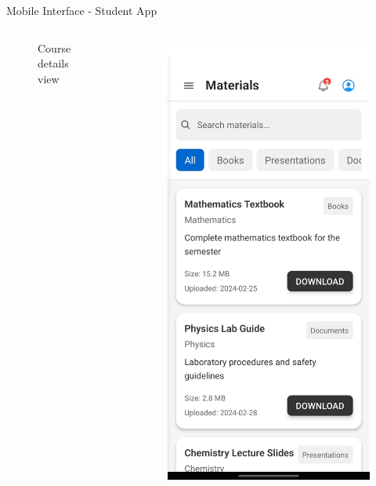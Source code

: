 \documentclass[aspectratio=169]{beamer}
\begin{document}
\begin{frame}{Mobile Interface - Student App}
\begin{columns}
\begin{figure}
            \caption{Course details view}
        \end{figure}
        \begin{figure}
            \includegraphics[width=\textwidth,height=0.6\textheight,keepaspectratio]{../pfe-pics/Mobile /Students/Screenshot_20250610_130310_Expo Go.jpg}

\end{figure}
\end{columns}
\end{frame}
\end{document}
